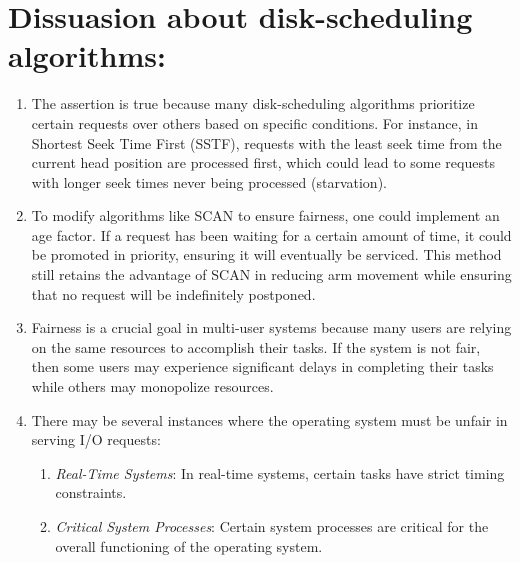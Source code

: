 \documentclass{article}
\begin{document}
\section{Dissuasion about disk-scheduling algorithms:}
\begin{enumerate}[label=\alph*]
	\item The assertion is true because many disk-scheduling algorithms prioritize certain requests
	      over others based on specific conditions. For instance, in Shortest Seek Time First (SSTF),
	      requests with the least seek time from the current head position are processed first, which
	      could lead to some requests with longer seek times never being processed (starvation).

	\item To modify algorithms like SCAN to ensure fairness, one could implement an age factor.
	      If a request has been waiting for a certain amount of time, it could be promoted in priority,
	      ensuring it will eventually be serviced. This method still retains the advantage of SCAN in
	      reducing arm movement while ensuring that no request will be indefinitely postponed.

	\item Fairness is a crucial goal in multi-user systems because many users are relying on
	      the same resources to accomplish their tasks. If the system is not fair, then some users
	      may experience significant delays in completing their tasks while others may monopolize
	      resources.

	\item There may be several instances where the operating system must be unfair in serving I/O requests:
	      \begin{enumerate}
		      \item \textit{Real-Time Systems}: In real-time systems, certain tasks have strict timing constraints.
		      \item \textit{Critical System Processes}: Certain system processes are critical for the overall functioning of the operating system.
	      \end{enumerate}
\end{enumerate}
\end{document}
